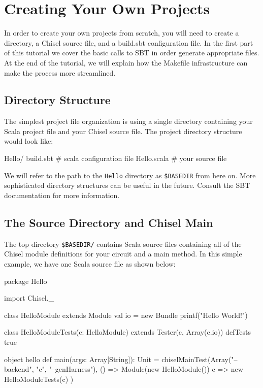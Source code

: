 \section{Creating Your Own Projects}

In order to create your own projects from scratch, you will need to create a directory, a Chisel source file, and a build.sbt configuration file. In the first part of this tutorial we cover the basic calls to SBT in order generate appropriate files. At the end of the tutorial, we will explain how the Makefile infrastructure can make the process more streamlined.

\subsection{Directory Structure}

The simplest project file organization is using a single directory containing your Scala project file and your Chisel source file.  The project directory structure would look like:

\begin{bash}
Hello/
  build.sbt   # scala configuration file
  Hello.scala # your source file
\end{bash}

We will refer to the path to the \verb+Hello+ directory as \verb+$BASEDIR+ from here on.  More sophisticated directory structures can be useful in the future.  Consult the SBT documentation for more information.

\subsection{The Source Directory and Chisel Main}

The top directory \verb+$BASEDIR/+ contains Scala source files containing all of the Chisel module definitions for your circuit and a main method.  In this simple example, we have one Scala source file as shown below:

\begin{scala}
package Hello

import Chisel._

class HelloModule extends Module {
  val io = new Bundle {}
  printf("Hello World!\n")
}

class HelloModuleTests(c: HelloModule) extends Tester(c, Array(c.io)) {
  defTests {
    true
  }
}

object hello {
  def main(args: Array[String]): Unit = {
    chiselMainTest(Array("--backend", "c", "--genHarness"),
      () => Module(new HelloModule()) {
        c => new HelloModuleTests(c)
      })
  }
}
\end{scala}

